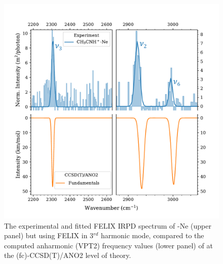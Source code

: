\begin{figure}
	\centering

		\includegraphics[scale=.7]{chapters/CH3CNH+/figures/felix_2_edited.pdf}
	\caption{The experimental and fitted FELIX IRPD spectrum of \pan-Ne (upper panel) but using FELIX in 3$^{rd}$ harmonic mode, compared to the computed anharmonic (VPT2) frequency values (lower panel) of \pa at the (fc)-CCSD(T)/ANO2 level of theory.}
	\label{FIG:felix_2}
	
\end{figure}

